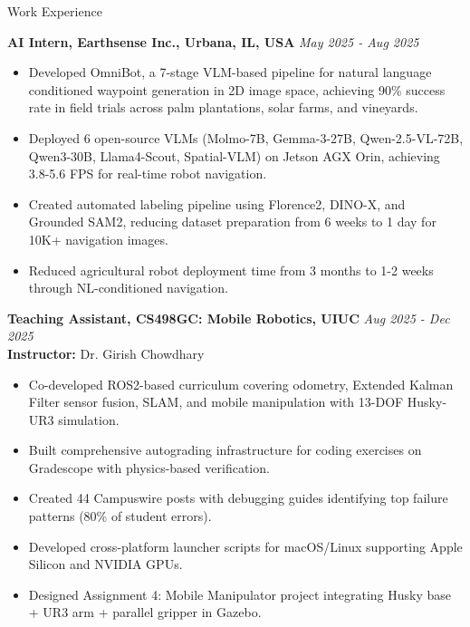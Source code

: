 \documentclass{resume} %
\begin{document}
% 
% 
% 
% 







\begin{rSection}{Work Experience}

    \textbf{AI Intern, Earthsense Inc., Urbana, IL, USA} \hfill \textit{May 2025 - Aug 2025}
    \vspace{-0.2cm}
    \begin{itemize}[noitemsep,nolistsep]
        \item Developed OmniBot, a 7-stage VLM-based pipeline for natural language conditioned waypoint generation in 2D image space, achieving 90\% success rate in field trials across palm plantations, solar farms, and vineyards.
        \item Deployed 6 open-source VLMs (Molmo-7B, Gemma-3-27B, Qwen-2.5-VL-72B, Qwen3-30B, Llama4-Scout, Spatial-VLM) on Jetson AGX Orin, achieving 3.8-5.6 FPS for real-time robot navigation.
        \item Created automated labeling pipeline using Florence2, DINO-X, and Grounded SAM2, reducing dataset preparation from 6 weeks to 1 day for 10K+ navigation images.
        \item Reduced agricultural robot deployment time from 3 months to 1-2 weeks through NL-conditioned navigation.
    \end{itemize}

    \vspace{0.2cm}

    \textbf{Teaching Assistant, CS498GC: Mobile Robotics, UIUC} \hfill \textit{Aug 2025 - Dec 2025}
    \\ \textbf{Instructor:} Dr. Girish Chowdhary
    \vspace{-0.2cm}
    \begin{itemize}[noitemsep,nolistsep]
        \item Co-developed ROS2-based curriculum covering odometry, Extended Kalman Filter sensor fusion, SLAM, and mobile manipulation with 13-DOF Husky-UR3 simulation.
        \item Built comprehensive autograding infrastructure for coding exercises on Gradescope with physics-based verification.
        \item Created 44 Campuswire posts with debugging guides identifying top failure patterns (80\% of student errors).
        \item Developed cross-platform launcher scripts for macOS/Linux supporting Apple Silicon and NVIDIA GPUs.
        \item Designed Assignment 4: Mobile Manipulator project integrating Husky base + UR3 arm + parallel gripper in Gazebo.
    \end{itemize}


\end{rSection}
\end{document}
